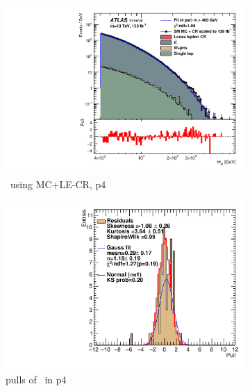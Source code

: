 \begin{figure}[H]
    \centering
    \begin{subfigure}[h]{0.38\linewidth}
    \includegraphics[scale=0.3]{figs/ch6/fit/variable_nosmooth/p4/10PB/output_SMMCplusCR_Mjb_p4.pdf}%
    \caption{\mjb \ using MC+LE-CR, p4}
    \end{subfigure}
    \hfill
    \begin{subfigure}[h]{0.4\linewidth}
    \includegraphics[scale=0.32]{figs/ch6/fit/variable_nosmooth/p4/10PB/pull_SMMCplusCR_Mjb_p4.pdf}%
    \caption{pulls of \mjb \ in p4}
    \end{subfigure}
    \hfill
    \begin{subfigure}[h]{0.38\linewidth}

\end{subfigure}
\end{figure}

